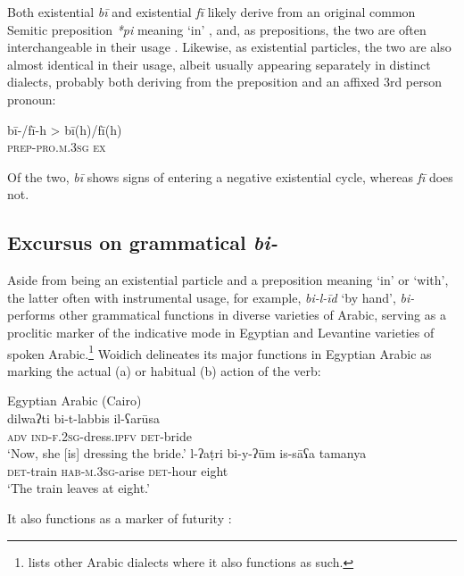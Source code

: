 \documentclass[output=paper]{langsci/langscibook}
\begin{document}
Both existential \textit{bī} and existential \textit{fī} likely derive from an original common Semitic preposition \textit{*pi} meaning ‘in’ \citep[470]{lipi2001a}, and, as prepositions, the two are often interchangeable in their usage \citep[479]{cowell2005a}. Likewise, as existential particles, the two are also almost identical in their usage, albeit usually appearing separately in distinct dialects, probably both deriving from the preposition and an affixed 3rd person pronoun:

\ea \label{ex:WiAR-23}
	\gll bī-/fī-h > bī(h)/fī(h)\\
	\textsc{prep-pro.m.3sg} {} \textsc{ex}\\
	\glt
\z


Of the two, \textit{bī} shows signs of entering a negative existential cycle, whereas \textit{fī} does not.

\subsection{Excursus on grammatical \textit{bi-}} \label{s:WiAR-4.1}

Aside from being an existential particle and a preposition meaning ‘in’ or ‘with’, the latter often with instrumental usage, for example, \textit{bi-l-īd} ‘by hand’, \textit{bi-} performs other grammatical functions in diverse varieties of Arabic, serving as a proclitic marker of the indicative mode in Egyptian \citep[61, 280–284]{woidich2006a} and Levantine \citep[180, 324–329]{cowell2005a} varieties of spoken Arabic.\footnote{\citet[64]{retsoe2014a} lists other Arabic dialects where it also functions as such.} Woidich delineates its major functions in Egyptian Arabic as marking the actual (a) or habitual (b) action of the verb:

\ea Egyptian Arabic (Cairo)\label{ex:WiAR-24}\\
  \ea
  	\gll dilwaʔti bi-t-labbis il-ʕarūsa\\
  	\textsc{adv} \textsc{ind-f.2sg}-dress.\textsc{ipfv}	\textsc{det}-bride\\
  	\glt ‘Now, she [is] dressing the bride.’ \citep[281]{woidich2006a}
  \ex
  	\gll l-ʔaṭri bi-y-ʔūm is-sāʕa tamanya\\
  	\textsc{det}-train \textsc{hab-m.3sg}-arise \textsc{det}-hour eight\\
  	\glt ‘The train leaves at eight.’ \citep[281]{woidich2006a}
\z \z

It also functions as a marker of futurity \citep[326]{cowell2005a}:
\end{document}

